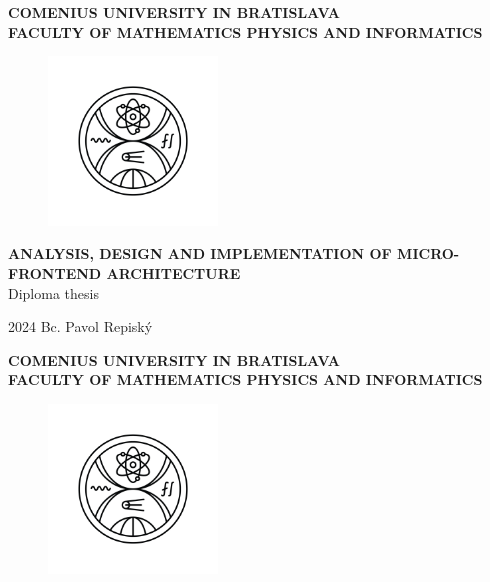 \documentclass[12pt, twoside]{book}
\def\mfrok{2024}
\def\mftitle{Analysis, Design and Implementation of Micro-frontend Architecture}
\def\mfauthor{Bc. Pavol Repiský}
\def\mfuniverzita{COMENIUS UNIVERSITY IN BRATISLAVA}
\def\mffakulta{FACULTY OF MATHEMATICS PHYSICS AND INFORMATICS}
\def\mftypprace{Diploma thesis}
\begin{document}
     
\frontmatter
\pagestyle{empty}

\noindent
\begin{minipage}{\textwidth}
    \begin{center}
      \textbf{\mfuniverzita\\
      \mffakulta}
    \end{center}
\end{minipage}

\vfill
\begin{figure}[!hbt]
	\begin{center}
		\includegraphics[width=0.4\textwidth]{images/FMFI_logo_BP.png}
		\label{img:logo}
	\end{center}
\end{figure}
\begin{center}
		\textbf{\MakeUppercase{\Large\mftitle}}\\
    \mftypprace
\end{center}
\vfill
\mfrok \hfill
\mfauthor
\cleardoublepage



\thispagestyle{empty}
\noindent
\begin{minipage}{\textwidth}
    \begin{center}
      \textbf{\mfuniverzita\\
      \mffakulta}
    \end{center}
\end{minipage}

\vfill
\begin{figure}[!hbt]
    \begin{center}
        \includegraphics[width=0.4\textwidth]{images/FMFI_logo_BP.png}
        \label{img:logo_dark}
    \end{center}
\end{figure}
\end{document}
